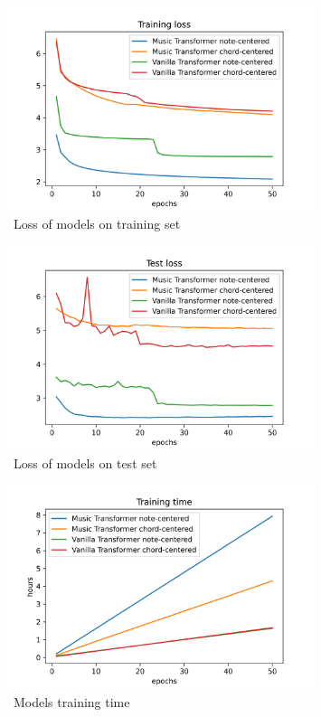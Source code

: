 \begin{figure}
    \centering
    \includegraphics[width=0.8\textwidth]{assets/training-loss}
    \caption{~Loss of models on training set}\label{fig:appendix-training-loss}
\end{figure}
\begin{figure}
    \centering
    \includegraphics[width=0.8\textwidth]{assets/test-loss}
    \caption{~Loss of models on test set}\label{fig:appendix-test-loss}
\end{figure}

\begin{figure}
    \centering
    \includegraphics[width=0.8\textwidth]{assets/training-time}
    \caption{~Models training time}\label{fig:appendix-training-time}
\end{figure}